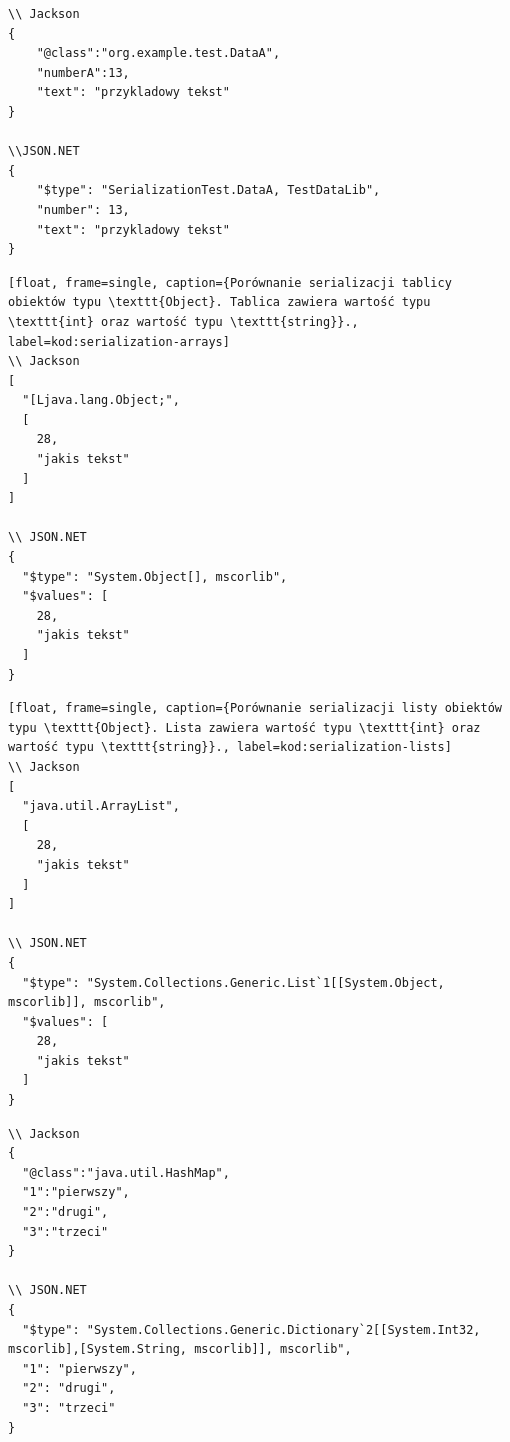 \begin{lstlisting}[float, frame=single, caption={Porównanie serializacji obiektów typu \texttt{DataA}}, label=kod:serilization-objects]
\\ Jackson
{
    "@class":"org.example.test.DataA",
    "numberA":13,
    "text": "przykladowy tekst"
}

\\JSON.NET
{
    "$type": "SerializationTest.DataA, TestDataLib",
    "number": 13,
    "text": "przykladowy tekst"
}
\end{lstlisting}

\begin{lstlisting}[float, frame=single, caption={Porównanie serializacji tablicy obiektów typu \texttt{Object}. Tablica zawiera wartość typu \texttt{int} oraz wartość typu \texttt{string}}., label=kod:serialization-arrays]
\\ Jackson
[
  "[Ljava.lang.Object;",
  [
    28,
    "jakis tekst"
  ]
]

\\ JSON.NET
{
  "$type": "System.Object[], mscorlib",
  "$values": [
    28,
    "jakis tekst"
  ]
}
\end{lstlisting}

\begin{lstlisting}[float, frame=single, caption={Porównanie serializacji listy obiektów typu \texttt{Object}. Lista zawiera wartość typu \texttt{int} oraz wartość typu \texttt{string}}., label=kod:serialization-lists]
\\ Jackson
[
  "java.util.ArrayList",
  [
    28,
    "jakis tekst"
  ]
]

\\ JSON.NET
{
  "$type": "System.Collections.Generic.List`1[[System.Object, mscorlib]], mscorlib",
  "$values": [
    28,
    "jakis tekst"
  ]
}
\end{lstlisting}

\begin{lstlisting}[float, frame=single, caption={Porównanie serializacji słownika/mapy (\emph{dictionary/map}) mapującego wartość typu \texttt{string} do wartości typu \texttt{int} (\texttt{int} jest kluczem).}, label=kod:serialization-dicts]
\\ Jackson
{
  "@class":"java.util.HashMap",
  "1":"pierwszy",
  "2":"drugi",
  "3":"trzeci"
}

\\ JSON.NET
{
  "$type": "System.Collections.Generic.Dictionary`2[[System.Int32, mscorlib],[System.String, mscorlib]], mscorlib",
  "1": "pierwszy",
  "2": "drugi",
  "3": "trzeci"
}
\end{lstlisting}

